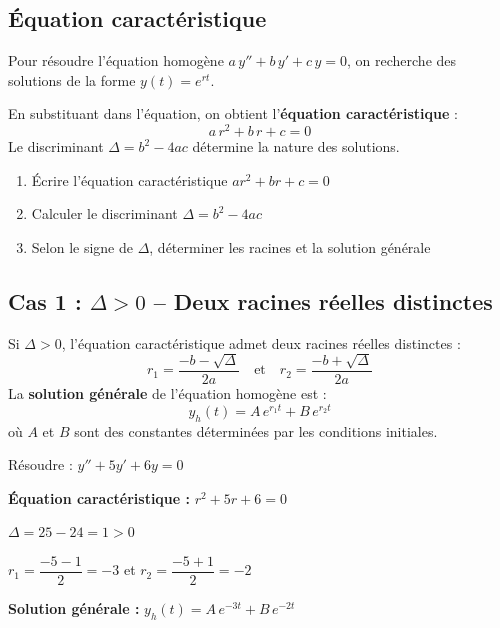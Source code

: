 \documentclass[a4paper,11pt]{article}
\begin{document}
\subsection{Équation caractéristique}

\begin{theoreme}
Pour résoudre l'équation homogène $a\,y'' + b\,y' + c\,y = 0$, on recherche des solutions de la forme $y(t) = e^{rt}$.

En substituant dans l'équation, on obtient l'\textbf{équation caractéristique} :
\[
\boxed{a\,r^2 + b\,r + c = 0}
\]
Le discriminant $\Delta = b^2 - 4ac$ détermine la nature des solutions.
\end{theoreme}

\begin{methode}
\begin{enumerate}
  \item Écrire l'équation caractéristique $ar^2 + br + c = 0$
  \item Calculer le discriminant $\Delta = b^2 - 4ac$
  \item Selon le signe de $\Delta$, déterminer les racines et la solution générale
\end{enumerate}
\end{methode}

\subsection{Cas 1 : $\Delta > 0$ -- Deux racines réelles distinctes}

\begin{theoreme}
Si $\Delta > 0$, l'équation caractéristique admet deux racines réelles distinctes :
\[
r_1 = \frac{-b - \sqrt{\Delta}}{2a} \quad \text{et} \quad r_2 = \frac{-b + \sqrt{\Delta}}{2a}
\]
La \textbf{solution générale} de l'équation homogène est :
\[
\boxed{y_h(t) = A\,e^{r_1 t} + B\,e^{r_2 t}}
\]
où $A$ et $B$ sont des constantes déterminées par les conditions initiales.
\end{theoreme}

\begin{exemple}
Résoudre : $y'' + 5y' + 6y = 0$

\textbf{Équation caractéristique :} $r^2 + 5r + 6 = 0$

$\Delta = 25 - 24 = 1 > 0$

$r_1 = \dfrac{-5 - 1}{2} = -3$ \quad et \quad $r_2 = \dfrac{-5 + 1}{2} = -2$

\textbf{Solution générale :} $y_h(t) = A\,e^{-3t} + B\,e^{-2t}$
\end{exemple}
\end{document}
